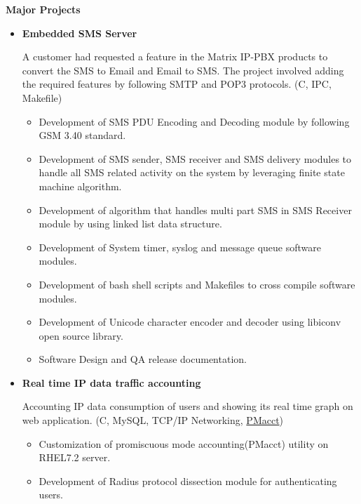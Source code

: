 \documentclass[letterpaper,10pt]{article}
\newcommand{\resitem}[1]{\item #1 \vspace{-2pt}}
\newcommand{\resheading}[1]{{\large \colorbox{mygrey}{\begin{minipage}{\textwidth}{\textbf{#1 \vphantom{p\^{E}}}}\end{minipage}}}}
\begin{document}
\resheading{Major Projects}
\begin{itemize}

\item
    \textbf{Embedded SMS Server}
    
    A customer had requested a feature in the Matrix IP-PBX products to convert the SMS to Email and Email to SMS. The project involved adding the required features by following SMTP and POP3 protocols. (C, IPC, Makefile)

	\begin{itemize}
		\resitem{Development of SMS PDU Encoding and Decoding module by following GSM 3.40 standard.}
		
		\resitem{Development of SMS sender, SMS receiver and SMS delivery modules to handle all SMS related activity on the system by leveraging finite state machine algorithm.}
	    
	    \resitem{Development of algorithm that handles multi part SMS in SMS Receiver module by using linked list data structure.}
	    
	    \resitem{Development of System timer, syslog and message queue software modules.}
	    
	    \resitem{Development of bash shell scripts and Makefiles to cross compile software modules.}
        
        \resitem{Development of Unicode character encoder and decoder using libiconv open source library.}
        
        \resitem{Software Design and QA release documentation.}
		
	\end{itemize}
	
\item
    \textbf{Real time IP data traffic accounting}
    
    Accounting IP data consumption of users and showing its real time graph on web application. (C, MySQL, TCP/IP Networking, \href{https://github.com/mehul-m-prajapati/pmacct}{PMacct})
    
	\begin{itemize}
	    \resitem{Customization of promiscuous mode accounting(PMacct) utility on RHEL7.2 server.}
	
	    \resitem{Development of Radius protocol dissection module for authenticating users.}
		

\end{itemize}
\end{itemize}
\end{document}

